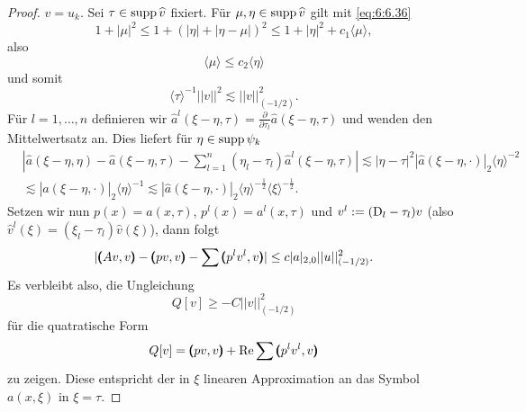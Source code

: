 \begin{proof}
 $v= u_k$. Sei $\tau\in \operatorname{supp} \widehat{v}$ fixiert. Für $\mu, \eta \in \operatorname{supp} \widehat{v}$ gilt mit \eqref{eq:6:6.36}
\begin{equation}
	1+|\mu|^2 \le 1+\left(| \eta|+| \eta-\mu|\right)^2 \le 1+|\eta|^2+ c_1 \langle \mu \rangle,
\end{equation}
also
\begin{equation}
	\langle \mu\rangle \le c_2\langle \eta\rangle
\end{equation}
und somit
\begin{equation}\label{Abschaetzung 0-Norm}
	\langle \tau\rangle^{-1}|| v||^2 \lesssim|| v||_{\left(-{1}/{2}\right)}^2.
\end{equation}
Für $l=1,\ldots, n$ definieren wir $\widehat{a}^l(\xi-\eta,\tau)=\frac{\partial}{\partial \tau_l}\widehat{a}(\xi-\eta,\tau)$ und wenden den Mittelwertsatz an. Dies liefert für $\eta\in \operatorname{supp} \psi_k$ 
\begin{equation}
\begin{split}	&| \widehat{a}(\xi-\eta,\eta)-\widehat{a}(\xi-\eta,\tau) -\sum\limits_{l=1}^n (\eta_l-\tau_l)\widehat{a}^l\left(\xi-\eta,\tau\right)| \lesssim| \eta-\tau|^2| \widehat{a}(\xi-\eta,\cdot)|_2\langle\eta\rangle^{-2} \\&
\lesssim | \widehat{a}(\xi-\eta,\cdot)|_2 \langle\eta\rangle^{-1} \lesssim| \widehat{a}(\xi-\eta,\cdot)|_2\langle\eta\rangle^{-\frac{1}{2}}\langle\xi\rangle^{-\frac{1}{2}}.
\end{split}
\end{equation}
Setzen wir nun $p(x)=a(x,\tau)$, $p^l(x)= a^l(x,\tau) $ und $v^l:=(\mathrm D_l-\tau_l)v$ (also $\widehat{v}^l(\xi)=\left(\xi_l-\tau_l\right)\widehat{v}(\xi)$), dann folgt
\begin{equation}
	|\pmb(Av,v\pmb)-\pmb(pv,v\pmb)-\sum\pmb(p^lv^l,v\pmb)| \le c | a|_{2,0}|| u||_{\left(-{1}/{2}\right)}^2.
\end{equation}
Es verbleibt also, die Ungleichung 
\begin{equation}
	Q[v] \ge -C|| v||_{\left(-{1}/{2}\right)}^2
\end{equation}
für die quatratische Form
\begin{equation}
	Q[v]=\pmb(pv,v\pmb)+\operatorname{Re}\sum\pmb(p^lv^l,v\pmb) 
\end{equation}
zu zeigen. Diese entspricht der in $\xi$ linearen Approximation an das Symbol $a(x,\xi)$ in $\xi=\tau$.


\end{proof}
